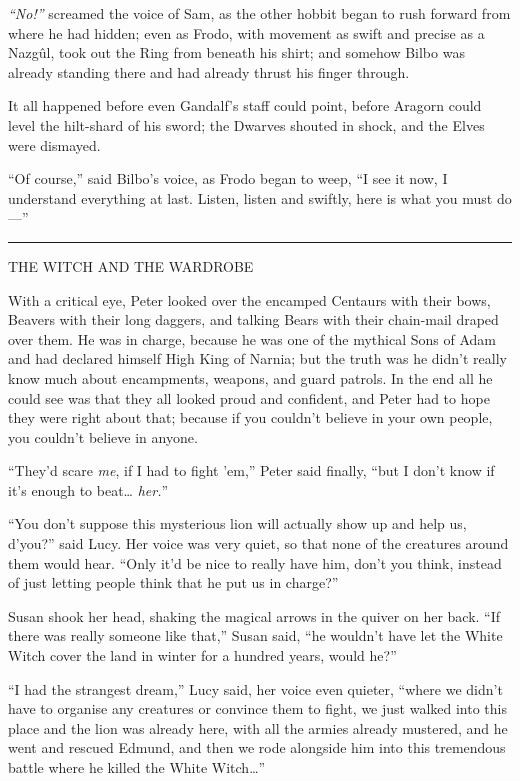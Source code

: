 \emph{``No!''} screamed the voice of Sam, as the other hobbit began to
rush forward from where he had hidden; even as Frodo, with movement as
swift and precise as a Nazgûl, took out the Ring from beneath his shirt;
and somehow Bilbo was already standing there and had already thrust his
finger through.

It all happened before even Gandalf's staff could point, before Aragorn
could level the hilt-shard of his sword; the Dwarves shouted in shock,
and the Elves were dismayed.

``Of course,'' said Bilbo's voice, as Frodo began to weep, ``I see it
now, I understand everything at last. Listen, listen and swiftly, here
is what you must do---''

\begin{center}\rule{3in}{0.4pt}\end{center}

THE WITCH AND THE WARDROBE

With a critical eye, Peter looked over the encamped Centaurs with their
bows, Beavers with their long daggers, and talking Bears with their
chain-mail draped over them. He was in charge, because he was one of the
mythical Sons of Adam and had declared himself High King of Narnia; but
the truth was he didn't really know much about encampments, weapons, and
guard patrols. In the end all he could see was that they all looked
proud and confident, and Peter had to hope they were right about that;
because if you couldn't believe in your own people, you couldn't believe
in anyone.

``They'd scare \emph{me}, if I had to fight 'em,'' Peter said finally,
``but I don't know if it's enough to beat\ldots{} \emph{her.}''

``You don't suppose this mysterious lion will actually show up and help
us, d'you?'' said Lucy. Her voice was very quiet, so that none of the
creatures around them would hear. ``Only it'd be nice to really have
him, don't you think, instead of just letting people think that he put
us in charge?''

Susan shook her head, shaking the magical arrows in the quiver on her
back. ``If there was really someone like that,'' Susan said, ``he
wouldn't have let the White Witch cover the land in winter for a hundred
years, would he?''

``I had the strangest dream,'' Lucy said, her voice even quieter,
``where we didn't have to organise any creatures or convince them to
fight, we just walked into this place and the lion was already here,
with all the armies already mustered, and he went and rescued Edmund,
and then we rode alongside him into this tremendous battle where he
killed the White Witch\ldots{}''


